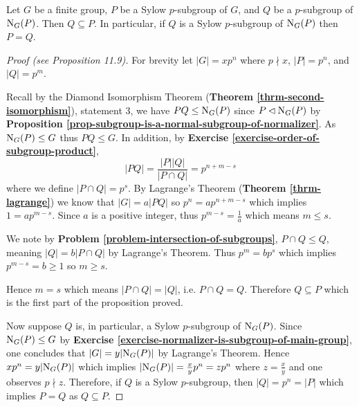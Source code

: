 \begin{proposition}\label{prop-normalizer-of-sylow-p-subgroup}
    Let $G$ be a finite group, $P$ be a Sylow $p$-subgroup of $G$, and $Q$ be a $p$-subgroup of $\mathrm{N}_{G}(P)$. Then $Q \subseteq P$. In particular, if $Q$ is a Sylow $p$-subgroup of $\mathrm{N}_{G}(P)$ then $P = Q$.
\end{proposition}
\begin{proof}[Proof (see \cite{humphreys_1996} Proposition 11.9)]
    For brevity let $|G| = xp^n$ where $p \nmid x$, $|P| = p^n$, and $|Q| = p^m$.

    Recall by the Diamond Isomorphism Theorem (\textbf{Theorem \ref{thrm-second-isomorphism}}), statement 3, we have $PQ \leq \mathrm{N}_{G}(P)$ since $P \lhd \mathrm{N}_{G}(P)$ by \textbf{Proposition \ref{prop-subgroup-is-a-normal-subgroup-of-normalizer}}. As $\mathrm{N}_{G}(P) \leq G$ thus $PQ \leq G$. In addition, by \textbf{Exercise \ref{exercise-order-of-subgroup-product}},
    \[
        |PQ| = \frac{|P||Q|}{|P \cap Q|} = p^{n+m-s}
    \]
    where we define $|P \cap Q| = p^s$. By Lagrange's Theorem (\textbf{Theorem \ref{thrm-lagrange}}) we know that $|G| = a|PQ|$ so $p^n = ap^{n+m-s}$ which implies $1 = ap^{m-s}$. Since $a$ is a positive integer, thus $p^{m-s} = \frac 1a$ which means $m \leq s$.

    We note by \textbf{Problem \ref{problem-intersection-of-subgroups}}, $P \cap Q \leq Q$, meaning $|Q| = b|P\cap Q|$ by Lagrange's Theorem. Thus $p^m = bp^s$ which implies $p^{m-s} = b \geq 1$ so $m \geq s$.

    Hence $m = s$ which means $|P \cap Q| = |Q|$, i.e. $P \cap Q = Q$. Therefore $Q \subseteq P$ which is the first part of the proposition proved.

    Now suppose $Q$ is, in particular, a Sylow $p$-subgroup of $\mathrm{N}_{G}(P)$. Since $\mathrm{N}_{G}(P) \leq G$ by \textbf{Exercise \ref{exercise-normalizer-is-subgroup-of-main-group}}, one concludes that $|G| = y|\mathrm{N}_{G}(P)|$ by Lagrange's Theorem. Hence $xp^n = y|\mathrm{N}_{G}(P)|$ which implies $|\mathrm{N}_{G}(P)| = \frac{x}{y} p^n = zp^n$ where $z = \frac xy$ and one observes $p \nmid z$. Therefore, if $Q$ is a Sylow $p$-subgroup, then $|Q| = p^n = |P|$ which implies $P = Q$ as $Q \subseteq P$.
\end{proof}



